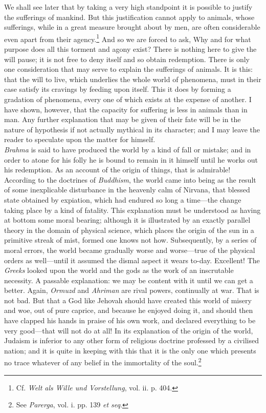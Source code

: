 We shall see later that by taking a very high standpoint it is
possible to justify the sufferings of  mankind. But this
justification cannot apply to animals, whose sufferings, while in a
great measure brought about by men, are often considerable even apart
from their agency.\footnote{Cf. \textit{Welt als Wille und
Vorstellung}, vol. ii. p. 404.} And so we are forced to ask, Why and
for what purpose does all this torment and agony exist? There is
nothing here to give the will pause; it is not free to deny itself
and so obtain redemption. There is only one consideration that may
serve to explain the sufferings of animals. It is this: that the will
to live, which underlies the whole world of phenomena, must in their
case satisfy its cravings by feeding upon itself. This it does by
forming a gradation of phenomena, every one of which exists at the
expense of another. I have shown, however, that the capacity for
suffering is less in animals than in man. Any further explanation that
may be given of their fate will be in the nature of hypothesis if not
actually mythical in its character; and I may leave the reader to
speculate upon the matter for himself.\\


\textit{Brahma} is said to have produced the world by a kind of fall
or mistake; and in order to atone for his folly he is bound to remain
in it himself until he works out his redemption. As an account of the
origin of things, that is admirable! According to the doctrines of
\textit{Buddhism}, the world came into being as the result of some
inexplicable disturbance in the heavenly calm of Nirvana, that blessed
state obtained by expiation, which had endured so long a time---the
change taking place by a kind of fatality. This  explanation
must be understood as having at bottom some moral bearing; although it
is illustrated by an exactly parallel theory in the domain of physical
science, which places the origin of the sun in a primitive streak of
mist, formed one knows not how. Subsequently, by a series of moral
errors, the world became gradually worse and worse---true of the
physical orders as well---until it assumed the dismal aspect it wears
to-day. Excellent! The \textit{Greeks} looked upon the world and the
gods as the work of an inscrutable necessity. A passable explanation:
we may be content with it until we can get a better. Again,
\textit{Ormuzd} and \textit{Ahriman} are rival powers, continually at
war. That is not bad. But that a God like Jehovah should have created
this world of misery and woe, out of pure caprice, and because he
enjoyed doing it, and should then have clapped his hands in praise of
his own work, and declared everything to be very good---that will not
do at all! In its explanation of the origin of the world, Judaism is
inferior to any other form of religious doctrine professed by a
civilised nation; and it is quite in keeping with this that it is the
only one which presents no trace whatever of any belief in the
immortality of the soul.\footnote{See \textit{Parerga}, vol. i. pp.
139 \textit{et seq}.}

